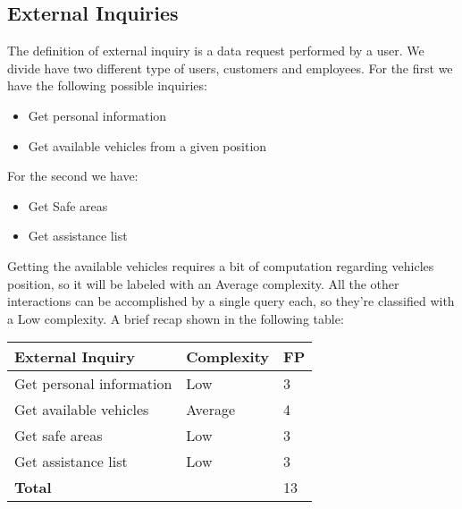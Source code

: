 \subsection{External Inquiries}
The definition of external inquiry is a data request performed by a user. We divide have two different type of users, customers and employees. For the first we have the following possible inquiries:
\begin{itemize}
\item Get personal information
\item Get available vehicles from a given position
\end{itemize}
For the second we have:
\begin{itemize}
\item Get Safe areas
\item Get assistance list
\end{itemize}
Getting the available vehicles requires a bit of computation regarding vehicles position, so it will be labeled with an Average complexity. All the other interactions can be accomplished by a single query each, so they're classified with a Low complexity. A brief recap shown in the following table:\\
\begin{tabular}{|p{6cm}|p{3cm}|p{2cm}|}
\hline
\textbf{External Inquiry} & \textbf{Complexity} & \textbf{FP}\\
\hline
Get personal information & Low & 3\\
Get available vehicles & Average & 4\\
Get safe areas & Low & 3\\
Get assistance list & Low & 3\\
\hline
\multicolumn{2}{|l|}{\textbf{Total}} & 13\\
\hline
\end{tabular}